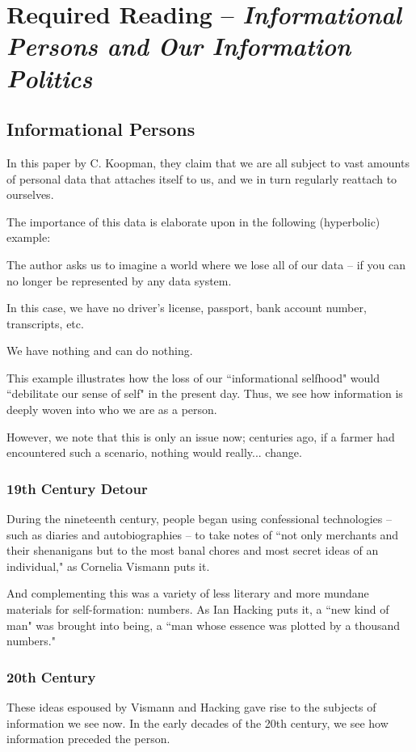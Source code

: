 \documentclass[openany]{book}
\begin{document}
\section{Required Reading -- \textit{Informational Persons and Our Information Politics}}

\subsection{Informational Persons}
In this paper by C. Koopman, they claim that we are all subject to vast amounts of personal data that attaches itself to us, and we in turn regularly reattach to ourselves.

The importance of this data is elaborate upon in the following (hyperbolic) example:
\begin{example}
	The author asks us to imagine a world where we lose all of our data -- if you can no longer be represented by any data system.
	
	In this case, we have no driver's license, passport, bank account number, transcripts, etc.
	
	We have nothing and can do nothing.
\end{example}

This example illustrates how the loss of our ``informational selfhood" would ``debilitate our sense of self" in the present day. Thus, we see how information is deeply woven into who we are as a person.

However, we note that this is only an issue now; centuries ago, if a farmer had encountered such a scenario, nothing would really... change.

\subsubsection{19th Century Detour} 
During the nineteenth century, people began using confessional technologies -- such as diaries and autobiographies -- to take notes of ``not only merchants and their shenanigans but to the most banal chores and most secret ideas of an individual," as Cornelia Vismann puts it.

And complementing this was a variety of less literary and more mundane materials for self-formation: numbers. As Ian Hacking puts it, a ``new kind of man" was brought into being, a ``man whose essence was plotted by a thousand numbers."

\subsubsection{20th Century}
These ideas espoused by Vismann and Hacking gave rise to the subjects of information we see now. In the early decades of the 20th century, we see how information preceded the person.
\end{document}

